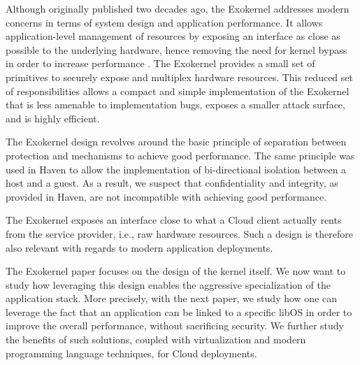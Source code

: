 Although originally published two decades ago, the Exokernel addresses modern concerns in terms of system design and application performance.
It allows application-level management of resources by exposing an interface as close as possible to the underlying hardware, hence removing the need for kernel bypass in order to increase performance \cite{BelayPKGKB14,DBLP:journals/tocs/CaoFKL96}.
The Exokernel provides a small set of primitives to securely expose and multiplex hardware resources.
This reduced set of responsibilities allows a compact and simple implementation of the Exokernel that is less amenable to implementation bugs, exposes a smaller attack surface, and is highly efficient.

The Exokernel design revolves around the basic principle of separation between protection and mechanisms to achieve good performance.
The same principle was used in Haven to allow the implementation of bi-directional isolation between a host and a guest.
As a result, we suspect that confidentiality and integrity, as provided in Haven, are not incompatible with achieving good performance.

The Exokernel exposes an interface close to what a Cloud client actually rents from the service provider, i.e., raw hardware resources.
Such a design is therefore also relevant with regards to modern application deployments. 

The Exokernel paper focuses on the design of the kernel itself.
We now want to study how leveraging this design enables the aggressive specialization of the application stack.
More precisely, with the next paper, we study how one can leverage the fact that an application can be linked to a specific libOS in order to improve the overall performance, without sacrificing security.
We further study the benefits of such solutions, coupled with virtualization and modern programming language techniques, for Cloud deployments.